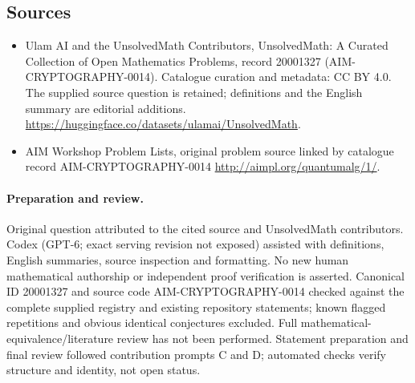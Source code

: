 \documentclass[11pt]{article}
\begin{document}
\subsection{Sources}
\begin{itemize}
\item[\hypertarget{source:20001327:1}{S1}] Ulam AI and the UnsolvedMath Contributors, UnsolvedMath: A Curated Collection of Open Mathematics Problems, record 20001327 (AIM-CRYPTOGRAPHY-0014). Catalogue curation and metadata: CC BY 4.0. The supplied source question is retained; definitions and the English summary are editorial additions.
\url{https://huggingface.co/datasets/ulamai/UnsolvedMath}.
\item[\hypertarget{source:20001327:2}{S2}] AIM Workshop Problem Lists, original problem source linked by catalogue record AIM-CRYPTOGRAPHY-0014
\url{http://aimpl.org/quantumalg/1/}.
\end{itemize}
\paragraph{Preparation and review.}
Original question attributed to the cited source and UnsolvedMath contributors. Codex (GPT-6; exact serving revision not exposed) assisted with definitions, English summaries, source inspection and formatting. No new human mathematical authorship or independent proof verification is asserted. Canonical ID 20001327 and source code AIM-CRYPTOGRAPHY-0014 checked against the complete supplied registry and existing repository statements; known flagged repetitions and obvious identical conjectures excluded. Full mathematical-equivalence/literature review has not been performed. Statement preparation and final review followed contribution prompts C and D; automated checks verify structure and identity, not open status.
\label{end:20001327}
\end{document}
